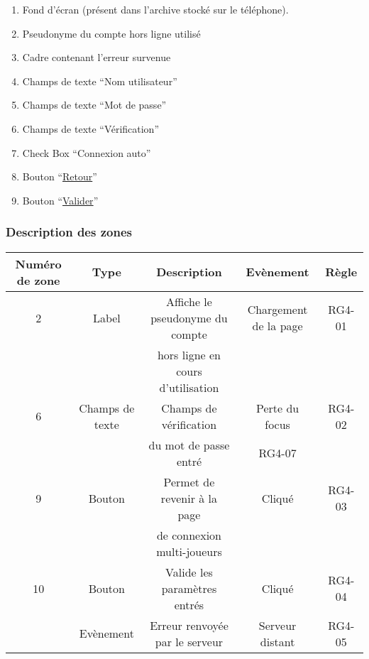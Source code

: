\documentclass{report}
\begin{document}
		\hypertarget{Creation compte multi-joueurs}{}
		\label{Creation compte multi-joueurs}
	
		\begin{center}
			
		\end{center}
		
		\begin{enumerate}
		  \item Fond d'écran (présent dans l'archive stocké sur le téléphone).
		  \item Pseudonyme du compte hors ligne utilisé
		  \item Cadre contenant l'erreur survenue
		  \item Champs de texte ``Nom utilisateur''
		  \item Champs de texte ``Mot de passe''
		  \item Champs de texte ``Vérification''
		  \item Check Box ``Connexion auto''
		  \item Bouton ``\hyperlink{Connexion multi-joueurs}{Retour}''
		  \item Bouton ``\hyperlink{Accueil multi-joueurs}{Valider}''
		\end{enumerate}
		
		\subsubsection{Description des zones}
		
			\begin{tabular}{|c|c|c|c|c|} \hline
				Numéro de zone & Type  & Description & Evènement &	Règle \\\hline
				2 & Label & Affiche le pseudonyme du compte & Chargement de la page & RG4-01 \\
				  &       & hors ligne en cours d'utilisation & & \\\hline
				6 & Champs de texte & Champs de vérification & Perte du focus & RG4-02 \\
				  & & du mot de passe entré & RG4-07 & \\\hline 
				9 & Bouton & Permet de revenir à la page & Cliqué & RG4-03 \\
				  &        & de connexion multi-joueurs \footnotemark[1] & & \\\hline
				10 & Bouton & Valide les paramètres entrés & Cliqué & RG4-04 \\\hline
				   & Evènement & Erreur renvoyée par le serveur & Serveur distant & RG4-05 \\\hline
			\end{tabular}
			
\end{document}
